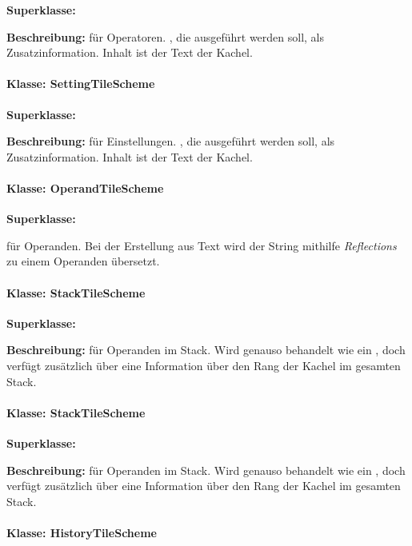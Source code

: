 \textbf{Superklasse:} 

\textbf{Beschreibung:} für Operatoren. , die ausgeführt werden soll, als Zusatzinformation. Inhalt ist der Text der Kachel.

\paragraph{Klasse: SettingTileScheme}

\textbf{Superklasse:} 

\textbf{Beschreibung:}  für Einstellungen. , die ausgeführt werden soll, als Zusatzinformation. Inhalt ist der Text der Kachel. 

\paragraph{Klasse: OperandTileScheme}

\textbf{Superklasse:} 

  für Operanden. Bei der Erstellung aus Text wird der String mithilfe \textit{Reflections} zu einem Operanden übersetzt.

\paragraph{Klasse: StackTileScheme}

\textbf{Superklasse:}

\textbf{Beschreibung:} für Operanden im Stack. Wird genauso behandelt wie ein , doch verfügt zusätzlich über eine Information über den Rang der Kachel im gesamten Stack.

\paragraph{Klasse: StackTileScheme}

\textbf{Superklasse:} 

\textbf{Beschreibung:}  für Operanden im Stack. Wird genauso behandelt wie ein , doch verfügt zusätzlich über eine Information über den Rang der Kachel im gesamten Stack.

\paragraph{Klasse: HistoryTileScheme}

